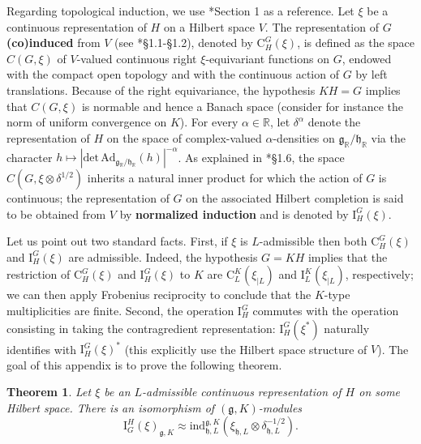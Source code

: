 \documentclass{amsart}
\newtheorem{theorem}{Theorem}[section]
\theoremstyle{definition}
\begin{document}
Regarding topological induction, we use \cite{vandenBan}*{Section 1} as a reference. Let $\xi$ be a continuous representation of $H$ on a Hilbert space $V$. The representation of $G$ \textbf{(co)induced} from $V$ (see \cite{vandenBan}*{§1.1-§1.2}), denoted by $\text{C}_H^G(\xi)$, is defined as the space $C(G,\xi)$ of $V$-valued continuous right $\xi$-equivariant functions on $G$, endowed with the compact open topology and with the continuous action of $G$ by left translations. Because of the right equivariance, the hypothesis $KH = G$ implies that $C(G,\xi)$ is normable and hence a Banach space (consider for instance the norm of uniform convergence on $K$). For every $\alpha \in \mathbb{R}$, let $\delta^{\alpha}$ denote the representation of $H$ on the space of complex-valued $\alpha$-densities on $\mathfrak{g}_\mathbb{R}/\mathfrak{h}_\mathbb{R}$ via the character $h  \mapsto |\mathrm{det}\, \mathrm{Ad}_{\mathfrak{g}_\mathbb{R}/\mathfrak{h}_\mathbb{R}}(h)|^{-\alpha}$. As explained in \cite{vandenBan}*{§1.6}, the space $C(G, \xi\otimes\delta^{1/2})$ inherits a natural inner product for which the action of $G$ is continuous; the representation of $G$ on the associated Hilbert completion is said to be obtained from $V$ by \textbf{normalized induction} and is denoted by $\text{I}_H^G(\xi)$.

Let us point out two standard facts. First, if $\xi$ is $L$-admissible then both $\mathrm{C}_H^G(\xi)$ and $\mathrm{I}_H^G(\xi)$ are admissible. Indeed, the hypothesis $G= KH$ implies that the restriction of $\mathrm{C}_H^G(\xi)$ and $\mathrm{I}_H^G(\xi)$ to $K$ are $\mathrm{C}_L^K(\xi_{|L})$ and $\mathrm{I}_L^K(\xi_{|L})$, respectively; we can then apply Frobenius reciprocity to conclude that the $K$-type multiplicities are finite. Second, the operation $\mathrm{I}_H^G$ commutes with the operation consisting in taking the contragredient representation: $\mathrm{I}_H^G(\xi^*)$ naturally identifies with $\mathrm{I}_H^G(\xi)^*$ (this explicitly use the Hilbert space structure of $V$). The goal of this appendix is to prove the following theorem.

\begin{theorem}\label{comparisonInd}
    Let $\xi$ be an $L$-admissible continuous representation of $H$ on some Hilbert space. There is an isomorphism of $(\mathfrak{g},K)$-modules
    \[\mathrm{I}_G^H(\xi)_{\mathfrak{g},K} \approx \mathrm{ind}_{\mathfrak{h},L}^{\mathfrak{g},K}(\xi_{\mathfrak{h},L} \otimes \delta^{-1/2}_{\mathfrak{h},L}).\]
\end{theorem}
\end{document}
